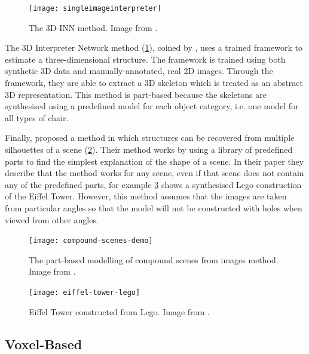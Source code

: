 \begin{figure}[ht]
  \centering
  \texttt{[image: singleimageinterpreter]}
  \caption{The 3D-INN method. Image from \protect\citet{2016singleimageinterpreter}.}
  \label{fig:3dinn}
\end{figure}

The 3D Interpreter Network method (\cref{fig:3dinn}), coined by \citet{2016singleimageinterpreter}, uses a trained framework to estimate a three-dimensional structure. The framework is trained using both synthetic 3D data and manually-annotated, real 2D images. Through the framework, they are able to extract a 3D skeleton which is treated as an abstract 3D representation. This method is part-based because the skeletons are synthesised using a predefined model for each object category, i.e. one model for all types of chair.

Finally, \citet{compoundscenesfromimages} proposed a method in which structures can be recovered from multiple silhouettes of a scene (\cref{fig:compoundscenes}). Their method works by using a library of predefined parts to find the simplest explanation of the shape of a scene. In their paper they describe that the method works for any scene, even if that scene does not contain any of the predefined parts, for example \cref{fig:eiffellego} shows a synthesised Lego construction of the Eiffel Tower. However, this method assumes that the images are taken from particular angles so that the model will not be constructed with holes when viewed from other angles.

\begin{figure}[ht]
  \centering
  \texttt{[image: compound-scenes-demo]}
  \caption{The part-based modelling of compound scenes from images method. Image from \protect\citet{compoundscenesfromimages}.}
  \label{fig:compoundscenes}
\end{figure}

\begin{figure}[th]
  \centering
  \texttt{[image: eiffel-tower-lego]}
  \caption{Eiffel Tower constructed from Lego. Image from \protect\citet{compoundscenesfromimages}.}
  \label{fig:eiffellego}
\end{figure}


\subsection{Voxel-Based}\label{subsec:voxelbasedmodelling}

